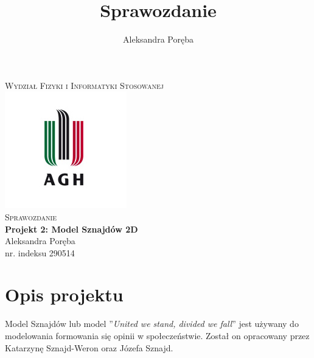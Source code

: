 \documentclass[12pt]{article}
\title{Sprawozdanie}
\author{Aleksandra Poręba}
\makeatletter
\let\thetitle\@title
\let\theauthor\@author
\makeatother
\begin{document}
\begin{center}
\textsc{\normalsize Wydział Fizyki i Informatyki Stosowanej}\\[2.0cm] 
\includegraphics[scale = 1]{logo.png}\\[1cm] 


\textsc{\Large Sprawozdanie}\\[0.4cm]
{ \huge \bfseries \LARGE{Projekt 2: Model Sznajdów 2D} }\\[1cm] 

\flushright \Large Aleksandra Poręba \\ nr. indeksu 290514

\vfill 

\center{\today}


\pagebreak 

\end{center}



\pagestyle{fancy}
\fancyhf{}

\rhead{\theauthor}
\lhead{\thetitle}
\cfoot{\thepage}

\section{Opis projektu}

Model Sznajdów lub model ''\textit{United we stand, divided we fall}'' jest używany do modelowania formowania się opinii w społeczeństwie. Został on opracowany przez Katarzynę Sznajd-Weron oraz Józefa Sznajd.
\end{document}
